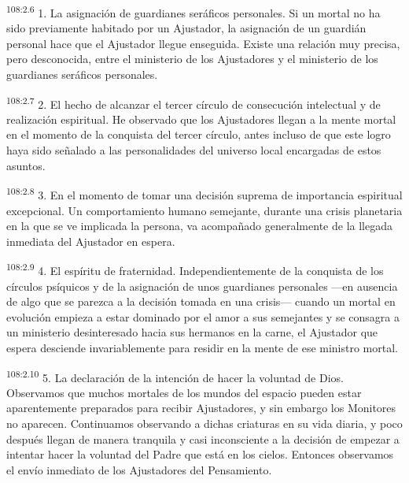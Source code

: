 \par
\textsuperscript{108:2.6} 1. La asignación de guardianes seráficos personales. Si un mortal no ha sido previamente habitado por un Ajustador, la asignación de un guardián personal hace que el Ajustador llegue enseguida. Existe una relación muy precisa, pero desconocida, entre el ministerio de los Ajustadores y el ministerio de los guardianes seráficos personales.

\par
\textsuperscript{108:2.7} 2. El hecho de alcanzar el tercer círculo de consecución intelectual y de realización espiritual. He observado que los Ajustadores llegan a la mente mortal en el momento de la conquista del tercer círculo, antes incluso de que este logro haya sido señalado a las personalidades del universo local encargadas de estos asuntos.

\par
\textsuperscript{108:2.8} 3. En el momento de tomar una decisión suprema de importancia espiritual excepcional. Un comportamiento humano semejante, durante una crisis planetaria en la que se ve implicada la persona, va acompañado generalmente de la llegada inmediata del Ajustador en espera.

\par
\textsuperscript{108:2.9} 4. El espíritu de fraternidad. Independientemente de la conquista de los círculos psíquicos y de la asignación de unos guardianes personales ---en ausencia de algo que se parezca a la decisión tomada en una crisis--- cuando un mortal en evolución empieza a estar dominado por el amor a sus semejantes y se consagra a un ministerio desinteresado hacia sus hermanos en la carne, el Ajustador que espera desciende invariablemente para residir en la mente de ese ministro mortal.

\par
\textsuperscript{108:2.10} 5. La declaración de la intención de hacer la voluntad de Dios. Observamos que muchos mortales de los mundos del espacio pueden estar aparentemente preparados para recibir Ajustadores, y sin embargo los Monitores no aparecen. Continuamos observando a dichas criaturas en su vida diaria, y poco después llegan de manera tranquila y casi inconsciente a la decisión de empezar a intentar hacer la voluntad del Padre que está en los cielos. Entonces observamos el envío inmediato de los Ajustadores del Pensamiento.

